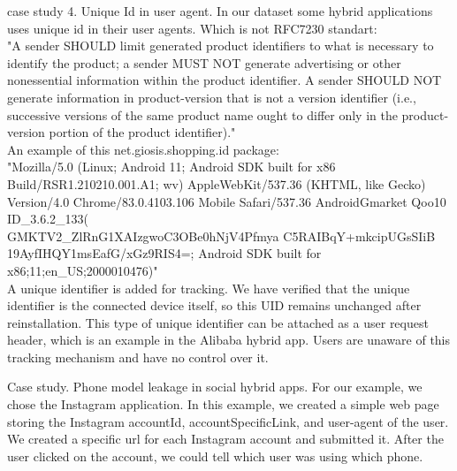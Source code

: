 case study 4. Unique Id in user agent.
In our dataset some hybrid applications uses unique id in their user agents. Which is not  RFC7230 standart:\\

"A sender SHOULD limit generated product identifiers to what is
   necessary to identify the product; a sender MUST NOT generate
   advertising or other nonessential information within the product
   identifier.  A sender SHOULD NOT generate information in
   product-version that is not a version identifier (i.e., successive versions of the same product name ought to differ only in the product-version portion of the product identifier)." \\
   
   
An example of this net.giosis.shopping.id package:
\\

               "Mozilla/5.0 (Linux; Android 11; Android SDK built for x86                        Build/RSR1.210210.001.A1; wv) AppleWebKit/537.36 (KHTML, like Gecko) Version/4.0 Chrome/83.0.4103.106 Mobile Safari/537.36 AndroidGmarket Qoo10 ID\_3.6.2\_133(\\GMKTV2\_ZlRnG1XAIzgwoC3OBe0hNjV4Pfmya
 C5RAIBqY+mkcipUGsSIiB\\19AyfIHQY1msEafG/xGz9RIS4=;
 Android SDK built for x86;11;en\_US;2000010476)"
 \\
 
A unique identifier is added for tracking. We have verified that the unique identifier is the connected device itself, so this UID remains unchanged after reinstallation.
This type of unique identifier can be attached as a user request header, which is an example in the Alibaba hybrid app.
Users are unaware of this tracking mechanism and have no control over it. 

Case study. Phone model leakage in social hybrid apps.
For our example, we chose the Instagram application. In this example, we created a simple web page storing the Instagram accountId, accountSpecificLink, and user-agent of the user.
 We created a specific url for each Instagram account and submitted it. After the user clicked on the account, we could tell which user was using which phone.
 

